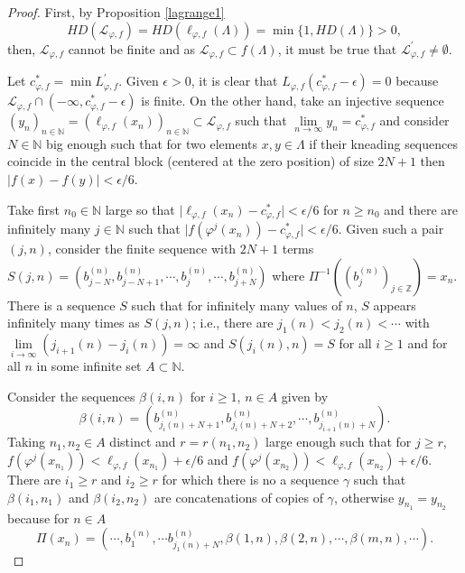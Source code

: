 \documentclass[12pt]{amsart}
\providecommand{\abs}[1]{\lvert#1\rvert}
\newcommand{\infinity}{\infty}
\theoremstyle{plain} %
\theoremstyle{definition} %
\numberwithin{equation}{section}
\begin{document}
\begin{proof}
First, by Proposition \ref{lagrange1} 
$$HD(\mathcal{L}_{\varphi,f})=HD(\ell_{\varphi,f}(\Lambda))=\min \{1,HD(\Lambda)\}>0,$$
then, $\mathcal{L}_{\varphi,f}$ cannot be finite and as $\mathcal{L}_{\varphi,f}\subset f(\Lambda)$, it must be true that $\mathcal{L}^{'} _{\varphi, f}\neq \emptyset$.

Let $c^*_{\varphi,f}=\min L^{'} _{\varphi, f}$. Given $\epsilon>0$, it is clear that $L_{\varphi,f}(c^*_{\varphi,f}-\epsilon)=0$ because $\mathcal{L}_{\varphi,f}\cap  (-\infinity,c^*_{\varphi,f}- \epsilon)$ is finite. On the other hand, take an injective sequence $(y_n)_{n\in \mathbb{N}}=(\ell_{\varphi,f}(x_n))_{n\in \mathbb{N}}\subset \mathcal{L}_{\varphi,f}$ such that $\lim \limits_{n\rightarrow \infinity}y_n=c^*_{\varphi,f}$ and consider $N\in \mathbb{N}$ big enough such that for two elements $x,y\in \Lambda$ if their kneading sequences coincide in the central block (centered at the zero position) of size $2N+1$ then $\abs{f(x)-f(y)}<\epsilon/6$.

Take first $n_0\in \mathbb{N}$ large so that $\abs{\ell_{\varphi,f}(x_n)-c^*_{\varphi,f}}<\epsilon/6$ for $n\geq n_0$ and there are infinitely many $j\in \mathbb{N}$ such that $\abs{f(\varphi^j(x_n))-c^*_{\varphi,f}}<\epsilon/6$. Given such a pair $(j,n)$, consider the finite sequence with $2N+1$ terms $S(j,n)=(b_{j-N}^{(n)},b_{j-N+1}^{(n)},\cdots, b_{j}^{(n)}, \cdots, b_{j+N}^{(n)})$ where $\Pi^{-1}((b_j^{(n)})_{j\in \mathbb{Z}})=x_n$. There is a sequence $S$ such that for infinitely many values of $n$, $S$ appears infinitely many times as $S(j,n)$; i.e., there are $j_1(n)<j_2(n)<\cdots$ with $\lim \limits_{i\rightarrow \infinity}(j_{i+1}(n)-j_i(n))=\infinity$ and $S(j_i(n),n)=S$ for all $i\geq 1$ and for all $n$ in some infinite set $A\subset \mathbb{N}$.

Consider the sequences $\beta(i,n)$ for $i\geq 1$, $n\in A$ given by
$$\beta(i,n)=(b_{j_i(n)+N+1}^{(n)},b_{j_i(n)+N+2}^{(n)},\cdots, b_{j_{i+1}(n)+N}^{(n)}).$$
Taking $n_1, n_2\in A$ distinct and $r=r(n_1,n_2)$ large enough such that for $j\geq r$, $f(\varphi^j(x_{n_1}))<\ell_{\varphi,f}(x_{n_1})+\epsilon/6$ and $f(\varphi^j(x_{n_2}))<\ell_{\varphi,f}(x_{n_2})+\epsilon/6$. There are $i_1\geq r$ and $i_2 \geq r$ for which there is no a sequence $\gamma$ such that $\beta(i_1,n_1)$ and $\beta(i_2,n_2)$ are concatenations of copies of $\gamma$, otherwise $y_{n_1}=y_{n_2}$  because for $n\in A$ 
$$\Pi(x_n)=(\cdots, b_1^{(n)},\cdots b_{j_1(n)+N}^{(n)},\beta(1,n),\beta(2,n),\cdots ,\beta(m,n), \cdots).$$


\end{proof}
\end{document}
